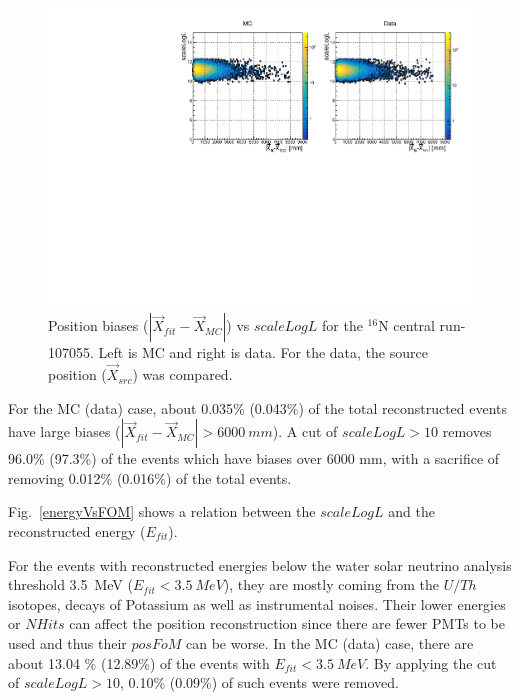 \begin{figure}
	\centering
		\includegraphics[width=13cm]{N16_107055_scaleLogLvsPosBias.pdf}
	\caption{Position biases ($|\vec{X}_{fit}-\vec{X}_{MC}|$) vs $scaleLogL$ for the $^{16}$N central run-107055. Left is MC and right is data. For the data, the source position ($\vec{X}_{src}$) was compared.}
	\label{posBiasVsFOM}
\end{figure}

For the MC (data) case, about 0.035\% (0.043\%) of the total reconstructed events have large biases ($|\vec{X}_{fit}-\vec{X}_{MC}|>6000~mm$). A cut of $scaleLogL>10$ removes 96.0\% (97.3\%) of the events which have biases over 6000 mm, with a sacrifice of removing 0.012\% (0.016\%) of the total events.

Fig.~\ref{energyVsFOM} shows a relation between the $scaleLogL$ and the reconstructed energy ($E_{fit}$). 

For the events with reconstructed energies below the water solar neutrino analysis threshold 3.5~MeV ($E_{fit}<3.5~MeV$), they are mostly coming from the $U/Th$ isotopes, decays of Potassium as well as instrumental noises\cite{waterunidoc}. Their lower energies or $NHits$ can affect the position reconstruction since there are fewer PMTs to be used and thus their $posFoM$ can be worse.
In the MC (data) case, there are about 13.04 \% (12.89\%) of the events with $E_{fit}<3.5~MeV$. By applying the cut of $scaleLogL>10$, 0.10\% (0.09\%) of such events were removed.

